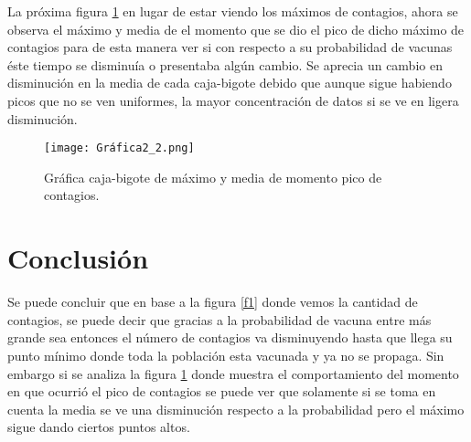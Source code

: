 \documentclass[a4paper, 11pt]{article}
\begin{document}
La próxima figura \ref{f2} en lugar de estar viendo los máximos de contagios, ahora se observa el máximo y media de el momento que se dio el pico de dicho máximo de contagios para de esta manera ver si con respecto a su probabilidad de vacunas éste tiempo se disminuía o presentaba algún cambio.
Se aprecia un cambio en disminución en la media de cada caja-bigote debido que aunque sigue habiendo picos que no se ven uniformes, la mayor concentración de datos si se ve en ligera disminución. 

\begin{figure}[H]
  \centering      
  \texttt{[image: Gráfica2\_2.png]}
  \caption{Gráfica caja-bigote de máximo y media de momento pico de contagios.}
  \label{f2}
\end{figure}


\section{Conclusión}
Se puede concluir que en base a la figura \ref{f1} donde vemos la cantidad de contagios, se puede decir que gracias a la probabilidad de vacuna entre más grande sea entonces el número de contagios va disminuyendo hasta que llega su punto mínimo donde toda la población esta vacunada y ya no se propaga.
Sin embargo si se analiza la figura \ref{f2} donde muestra el comportamiento del momento en que ocurrió el pico de contagios se puede ver que solamente si se toma en cuenta la media se ve una disminución respecto a la probabilidad pero el máximo sigue dando ciertos puntos altos. 
\bigskip


\end{document}

